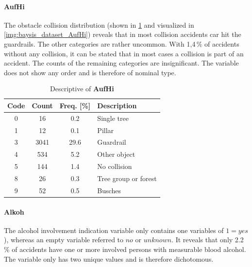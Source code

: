 \paragraph{AufHi}
\label{baysis_dataset_AufHi}
The obstacle collision distribution (shown in \cref{tbl:baysis_dataset_AufHi} and visualized in \cref{img:baysis_dataset_AufHi}) reveals that in most collision accidents car hit the guardrails. The other categories are rather uncommon. With 1,4\,\% of accidents without any collision, it can be stated that in most cases a collision is part of an accident. The counts of the remaining categories are insignificant. The variable does not show any order and is therefore of nominal type.
\begin{table}[ht]
	\centering
	\small
	\begin{tabular}{c|c|c|l} 
		\toprule
		Code & Count & Freq. [\%] & Description \\ 
		\midrule 
		0 & 16 		& 0.2	& Single tree \\
		1 & 12 		& 0.1	& Pillar \\
		3 & 3041	& 29.6	& Guardrail \\
		4 & 534		& 5.2	& Other object \\
		5 & 144		& 1.4	& No collision \\
		8 & 26		& 0.3	& Tree group or forest \\
		9 & 52		& 0.5	& Busches \\
		\bottomrule
	\end{tabular}
	\caption{Descriptive of \textbf{AufHi}}
	\label{tbl:baysis_dataset_AufHi}
	\vspace{-8mm}
\end{table}

\paragraph{Alkoh}
\label{baysis_dataset_Alkoh}
The alcohol involvement indication variable only contains one variables of $1 = yes$), whereas an empty variable referred to $no$ or $unknown$. It reveals that only 2.2\,\% of accidents have one or more involved persons with measurable blood alcohol. The variable only has two unique values and is therefore dichotomous.

